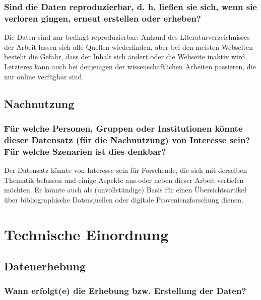 \subsubsection{Sind die Daten reproduzierbar, d. h. ließen sie sich, wenn sie verloren gingen, erneut erstellen oder erheben?}

Die Daten sind nur bedingt reproduzierbar:
Anhand des Literaturverzeichnisses der Arbeit lassen sich alle Quellen wiederfinden,
aber bei den meisten Webseiten besteht die Gefahr, dass der Inhalt sich ändert oder
die Webseite inaktiv wird. Letzteres kann auch bei denjenigen der wissenschaftlichen
Arbeiten passieren, die nur online verfügbar sind.

\subsection{Nachnutzung}

\subsubsection{Für welche Personen, Gruppen oder Institutionen könnte dieser Datensatz (für die Nachnutzung) von Interesse sein? Für welche Szenarien ist dies denkbar?}

Der Datensatz könnte von Interesse sein für Forschende, die sich mit derselben Thematik befassen
und einige Aspekte aus oder neben dieser Arbeit vertiefen möchten.
Er könnte auch als (unvollständige) Basis für einen Übersichtsartikel über bibliographische Datenquellen
oder digitale Provenienzforschung dienen.

\section{Technische Einordnung}

\subsection{Datenerhebung}

\subsubsection{Wann erfolgt(e) die Erhebung bzw. Erstellung der Daten?}

